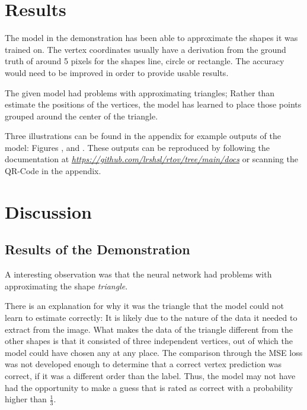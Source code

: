 \documentclass[12pt, a4paper, titlepage]{report}
\let\oldhref\href
\renewcommand{\href}[2]{\oldhref{#1}{\itshape#2}}
\begin{document}



\chapter{Results}

The model in the demonstration has been able to approximate the shapes it was trained on. The vertex coordinates usually have a derivation from the ground truth of around 5 pixels for the shapes line, circle or rectangle. The accuracy would need to be improved in order to provide usable results.

The given model had problems with approximating triangles; Rather than estimate the positions of the vertices, the model has learned to place those points grouped around the center of the triangle.

Three illustrations can be found in the appendix for example outputs of the model: Figures \cite{results_demonstration1}, \cite{results_demonstration2} and \cite{results_demonstration3}.
These outputs can be reproduced by following the documentation at \href{https://github.com/lrshsl/rtov/tree/main/docs}{https://github.com/lrshsl/rtov/tree/main/docs} or scanning the QR-Code in the appendix.





\chapter{Discussion}

\section{Results of the Demonstration}

A interesting observation was that the neural network had problems with approximating the shape \emph{triangle}.

There is an explanation for why it was the triangle that the model could not learn to estimate correctly: It is likely due to the nature of the data it needed to extract from the image. What makes the data of the triangle different from the other shapes is that it consisted of three independent vertices, out of which the model could have chosen any at any place. The comparison through the MSE loss was not developed enough to determine that a correct vertex prediction was correct, if it was a different order than the label. Thus, the model may not have had the opportunity to make a guess that is rated as correct with a probability higher than $\frac{1}{3}$.
\end{document}
